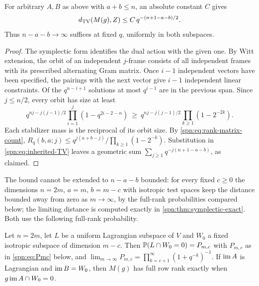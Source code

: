 \begin{theorem}\label{spn:thm:symplectic}
For arbitrary $A,B$ as above with $a+b\le n$, an absolute constant $C$ gives
\begin{equation}\label{spn:eq:symplectic-upper}
 d_{\mathrm{TV}}(M(g),Z)\le C\,q^{-(n+1-a-b)/2} .
\end{equation}
Thus $n-a-b\to\infty$ suffices at fixed $q$, uniformly in both subspaces.
\end{theorem}

\begin{proof}
The symplectic form identifies the dual action with the given one. By Witt
extension, the orbit of an independent $j$-frame consists of all independent
frames with its prescribed alternating Gram matrix. Once $i-1$ independent
vectors have been specified, the pairings with the next vector give $i-1$
independent linear constraints. Of the $q^{n-i+1}$ solutions at most
$q^{i-1}$ are in the previous span. Since $j\le n/2$, every orbit has size at
least
\[
 q^{nj-j(j-1)/2}\prod_{i=1}^j(1-q^{2i-2-n})
 \ \ge\ q^{nj-j(j-1)/2}\prod_{k\ge1}(1-2^{-2k}).
\]
Each stabilizer mass is the reciprocal of its orbit size. By
\eqref{spn:eq:rank-matrix-count},
$R_q(b,a;j)\le q^{j(a+b-j)}/\prod_{k\ge1}(1-2^{-k})$. Substitution in
\eqref{spn:eq:inherited-TV} leaves a geometric sum
$\sum_{j\ge1}q^{-j(n+1-a-b)}$, as claimed.
\end{proof}

The bound cannot be extended to $n-a-b$ bounded: for every fixed $c\ge0$ the
dimensions $n=2m$, $a=m$, $b=m-c$ with isotropic test spaces keep the distance
bounded away from zero as $m\to\infty$, by the full-rank probabilities compared
below; the limiting distance is computed exactly in
\cref{spn:thm:symplectic-exact}. Both use the following full-rank probability.

\begin{lemma}
Let $n=2m$, let $L$ be a uniform Lagrangian subspace of $V$ and $W_0$ a fixed
isotropic subspace of dimension $m-c$. Then $\mathbb{P}(L\cap W_0=0)=P_{m,c}$ with
$P_{m,c}$ as in \eqref{spn:eq:Pmc} below, and
$\lim_{m\to\infty}P_{m,c}=\prod_{k=c+1}^\infty(1+q^{-k})^{-1}$. If
$\operatorname{im} A$ is Lagrangian and $\operatorname{im} B=W_0$, then $M(g)$ has full row rank
exactly when $g\operatorname{im} A\cap W_0=0$.
\end{lemma}


